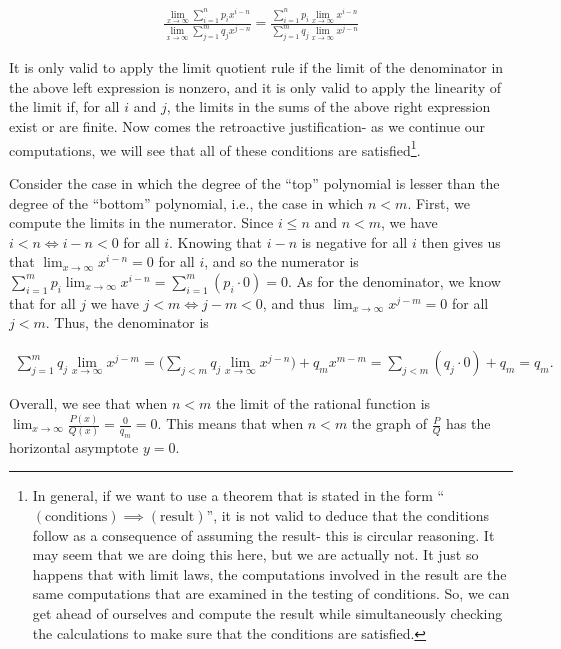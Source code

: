 \begin{align*}
    \frac{\lim_{x \rightarrow \infty} \sum_{i = 1}^n p_i x^{i - n}}{\lim_{x \rightarrow \infty} \sum_{j = 1}^m q_j x^{j - n}}
    = \frac{\sum_{i = 1}^n p_i \lim_{x \rightarrow \infty} x^{i - n}}{\sum_{j = 1}^m q_j \lim_{x \rightarrow \infty} x^{j - n}}
\end{align*}

It is only valid to apply the limit quotient rule if the limit of the denominator in the above left expression is nonzero, and it is only valid to apply the linearity of the limit if, for all $i$ and $j$, the limits in the sums of the above right expression exist or are finite. Now comes the retroactive justification- as we continue our computations, we will see that all of these conditions are satisfied\footnote{In general, if we want to use a theorem that is stated in the form ``$(\text{conditions}) \implies (\text{result})$'', it is not valid to deduce that the conditions follow as a consequence of assuming the result- this is circular reasoning. It may seem that we are doing this here, but we are actually not. It just so happens that with limit laws, the computations involved in the result are the same computations that are examined in the testing of conditions. So, we can get ahead of ourselves and compute the result while simultaneously checking the calculations to make sure that the conditions are satisfied.}.

Consider the case in which the degree of the ``top'' polynomial is lesser than the degree of the ``bottom'' polynomial, i.e., the case in which $n < m$. First, we compute the limits in the numerator. Since $i \leq n$ and $n < m$, we have $i < n \iff i - n < 0$ for all $i$. Knowing that $i - n$ is negative for all $i$ then gives us that $\lim_{x \rightarrow \infty} x^{i - n} = 0$ for all $i$, and so the numerator is $\sum_{i = 1}^m p_i \lim_{x \rightarrow \infty} x^{i - n} = \sum_{i = 1}^m (p_i \cdot 0) = 0$. As for the denominator, we know that for all $j$ we have $j < m \iff j - m < 0$, and thus $\lim_{x \rightarrow \infty} x^{j - m} = 0$ for all $j < m$. Thus, the denominator is 

\begin{align*}
    \sum_{j = 1}^m q_j \lim_{x \rightarrow \infty} x^{j - m} = \Big( \sum_{j < m} q_j \lim_{x \rightarrow \infty} x^{j - n} \Big) + q_m x^{m - m} = \sum_{j < m} (q_j \cdot 0) + q_m = q_m.
\end{align*}

Overall, we see that when $n < m$ the limit of the rational function is $\lim_{x \rightarrow \infty} \frac{P(x)}{Q(x)} = \frac{0}{q_m} = 0$. This means that when $n < m$ the graph of $\frac{P}{Q}$ has the horizontal asymptote $y = 0$. 

